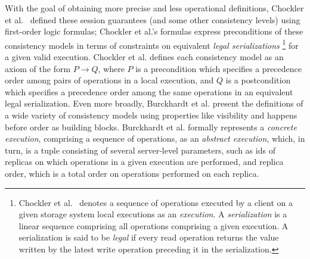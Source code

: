 \documentclass[journal,compsoc]{IEEEtran}
\begin{document}
 With the goal of obtaining more precise and less operational definitions, 
Chockler et al.~\cite{Chockler2000} defined these session guarantees (and some other consistency levels) using first-order logic formulas; Chockler et al.'s formulas express preconditions of these consistency models in terms of constraints on equivalent \emph{legal serializations} \footnote{Chockler et al.~\cite{Chockler2000} denotes a sequence of operations executed by a client on a given storage system local executions as an \emph{execution}. A \emph{serialization} is a linear sequence comprising all operations comprising a given execution. 
  A serialization is said to be \emph{legal} if every read operation returns the value written by the latest write
  operation preceding it in the serialization.} for a given valid execution. Chockler et al. defines each consistency model as an axiom of the form $P \rightarrow Q$, where $P$ is a  precondition which specifies a precedence order among pairs of operations in a local execution, and $Q$ is a postcondition which specifies a precedence order among the same operations in an equivalent legal serialization.  %
Even more broadly, Burckhardt et al. \cite{Burckhardt:2014:PEC:2693641.2693642} present the definitions of a wide variety of consistency models using properties like visibility and happens before order as building blocks. Burckhardt et al. \cite{DBLP:conf/popl/BurckhardtGYZ14, understanding-eventual-consistency, Burckhardt:2014:PEC:2693641.2693642} formally represents a \emph{concrete  execution}, comprising a sequence of operations, as an \emph{abstract execution}, which, in turn, is a tuple consisting of several server-level parameters, such as ids of replicas on which operations in a given execution are performed, and replica order, which is a total order on operations performed on each replica.  %
\end{document}
